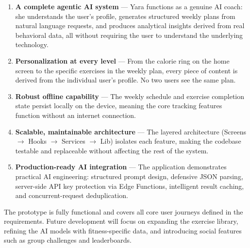 \begin{enumerate}
    \item \textbf{A complete agentic AI system} — Yara functions as a
    genuine AI coach: she understands the user's profile, generates
    structured weekly plans from natural language requests, and produces
    analytical insights derived from real behavioral data, all without
    requiring the user to understand the underlying technology.

    \item \textbf{Personalization at every level} — From the calorie ring
    on the home screen to the specific exercises in the weekly plan, every
    piece of content is derived from the individual user's profile. No two
    users see the same plan.

    \item \textbf{Robust offline capability} — The weekly schedule and
    exercise completion state persist locally on the device, meaning the
    core tracking features function without an internet connection.

    \item \textbf{Scalable, maintainable architecture} — The layered
    architecture (Screens $\rightarrow$ Hooks $\rightarrow$ Services
    $\rightarrow$ Lib) isolates each feature, making the codebase testable
    and replaceable without affecting the rest of the system.

    \item \textbf{Production-ready AI integration} — The application
    demonstrates practical AI engineering: structured prompt design,
    defensive JSON parsing, server-side API key protection via Edge
    Functions, intelligent result caching, and concurrent-request
    deduplication.
\end{enumerate}

The prototype is fully functional and covers all core user journeys defined
in the requirements. Future development will focus on expanding the exercise
library, refining the AI models with fitness-specific data, and introducing
social features such as group challenges and leaderboards.

